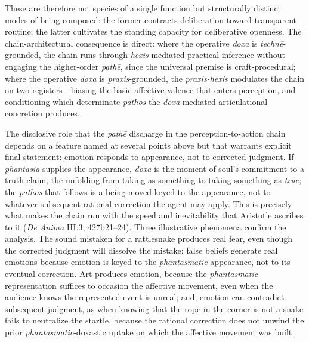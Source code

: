 \documentclass{article}
\begin{document}
These are therefore not species of a single function but structurally distinct modes of being-composed: the former contracts deliberation toward transparent routine; the latter cultivates the standing capacity for deliberative openness. The chain-architectural consequence is direct: where the operative \textit{doxa} is \textit{technē}-grounded, the chain runs through \textit{hexis}-mediated practical inference without engaging the higher-order \textit{pathē}, since the universal premise is craft-procedural; where the operative \textit{doxa} is \textit{praxis}-grounded, the \textit{praxis-hexis} modulates the chain on two registers---biasing the basic affective valence that enters perception, and conditioning which determinate \textit{pathos} the \textit{doxa}-mediated articulational concretion produces.

The disclosive role that the \textit{pathē} discharge in the perception-to-action chain depends on a feature named at several points above but that warrants explicit final statement: emotion responds to appearance, not to corrected judgment. If \textit{phantasia} supplies the appearance, \textit{doxa} is the moment of \textitthe soul's commitment to a truth-claim, the unfolding from taking-as-something to taking-something-as-\textit{true}; the \textit{pathos} that follows is a being-moved keyed to the appearance, not to whatever subsequent rational correction the agent may apply. This is precisely what makes the chain run with the speed and inevitability that Aristotle ascribes to it (\textit{De Anima} III.3, 427b21--24). Three illustrative phenomena confirm the analysis. The sound mistaken for a rattlesnake produces real fear, even though the corrected judgment will dissolve the mistake; false beliefs generate real emotions because emotion is keyed to the \textit{phantasmatic} appearance, not to its eventual correction. Art produces emotion, because the \textit{phantasmatic} representation suffices to occasion the affective movement, even when the audience knows the represented event is unreal; and, emotion can contradict subsequent judgment, as when knowing that the rope in the corner is not a snake fails to neutralize the startle, because the rational correction does not unwind the prior \textit{phantasmatic}-doxastic uptake on which the affective movement was built.
\end{document}
